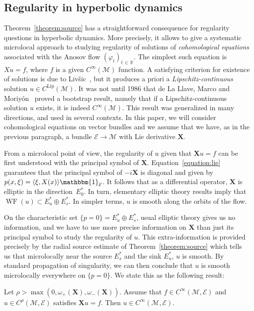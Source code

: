 \documentclass[AHL,Unicode,longabstracts,published]{cedram}
\newcommand{\R}{\mathbb{R}}
\newcommand{\X}{\mathbf{X}}
\newcommand{\M}{\mathcal{M}}
\newcommand{\E}{\mathcal{E}}
\newcommand{\Lip}{\mathrm{Lip}}
\DeclareMathOperator{\WF}{WF}
\begin{document}
\subsection{Regularity in hyperbolic dynamics}

Theorem~\ref{theorem:source} has a straightforward consequence for regularity questions in hyperbolic dynamics. More precisely, it allows to give a systematic microlocal approach to studying regularity of solutions of
\emph{cohomological equations} associated with the Anosov flow $(\varphi_t)_{t\,\in\,\R}$. The simplest such equation is $X u = f$, where $f$ is a given $C^\infty(\M)$ function. A satisfying criterion for existence of solutions is due to Liv{\v s}ic~\cite{Livsic-72}, but it produces a priori a \emph{Lipschitz-continuous} solution $u \in C^{\Lip}(\M)$. It was not until 1986 that de La Llave, Marco and Moriyón~\cite{DeLaLlave-Marco-Moryon-86} proved a bootstrap result, namely that if a Lipschitz-continuous solution $u$ exists, it is indeed $C^\infty(\M)$. This result was generalized in many directions, and used in several contexts. In this paper, we will consider cohomological equations on vector bundles and we assume that we have, as in the previous paragraph, a bundle $\E \to \M$ with Lie derivative $\X$.

From a microlocal point of view, the regularity of $u$ given that $\X u=f$ can be first understood with the principal symbol of $\X$. Equation~\eqref{equation:lie} guarantees that the principal symbol of $-i\X$ is diagonal and given by $p(x,\xi) = \langle \xi,X(x)\rangle \mathbbm{1}_{\E}$. It follows that as a differential operator, $\X$ is elliptic in the direction~$E^\ast_0$. In turn, elementary elliptic theory results imply that $\WF(u)\subset E^\ast_u\oplus E^\ast_s$. In simpler terms, $u$ is smooth along the orbits of the flow.

On the characteristic set $\{p= 0\} = E^\ast_u \oplus E^\ast_s$, usual elliptic theory gives us no information, and we have to use more precise information on $\X$ than just its principal symbol to study the regularity of $u$. This extra-information is provided precisely by the radial source estimate of Theorem~\ref{theorem:source} which tells us that microlocally near the source $E^\ast_s$ and the sink $E^\ast_u$, $u$ is smooth. By standard propagation of singularity, we can then conclude that $u$ is smooth microlocally everywhere on $\{p= 0\}$. We state this as the following result:

\begin{theo}\label{theorem:regularity}
Let $\rho> \max(0,\omega_+(\X),\omega_-(\X))$. Assume that $f\in C^{\infty}(\M,\E)$ and $u\in C^\rho(\M,\E)$ satisfies $\X u=f$. Then $u\in C^{\infty}(\M,\E)$.
\end{theo}
\end{document}
